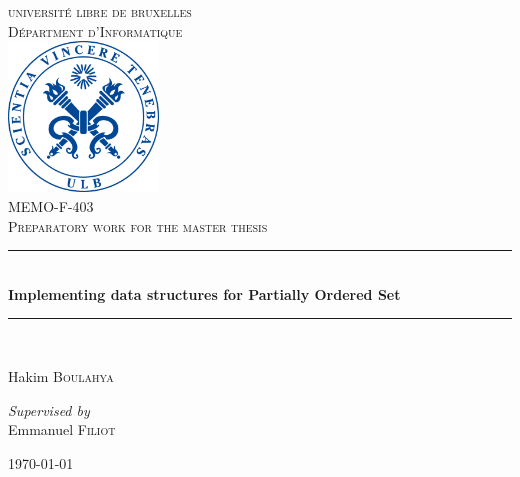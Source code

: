 \documentclass[letterpaper]{article}
\theoremstyle{definition}
\newcommand{\HRule}{\rule{\linewidth}{0.5mm}} %
\begin{document}
\begin{titlepage}

\begin{center}


\textsc{\LARGE universit\'e libre de bruxelles}\\[1.0cm]
\textsc{\Large D\'epartment d'Informatique}\\[1.5cm]

\includegraphics[width=0.3\textwidth]{images/ulblogo.jpg}~\\[1cm]

\textsc{
\large MEMO-F-403 \\
\Large  Preparatory work for the master thesis
 \\[1cm]}
\HRule \\[0.7cm]

{ \huge \bfseries Implementing data structures for
Partially Ordered Set \\[0.7cm] }

\HRule \\[2cm]

\noindent
\begin{center} \large

\Large Hakim \textsc{Boulahya}\\
\end{center}
\begin{center} \large

\emph{Supervised by} \\
\Large Emmanuel \textsc{Filiot} \\

\end{center}

\vfill
{\large \today}

\end{center}
\end{titlepage}
\end{document}
